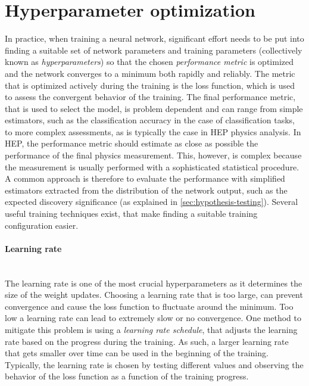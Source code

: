 \section{Hyperparameter optimization} 
In practice, when training a neural network, significant effort needs to be put into finding a suitable set of network parameters and training parameters (collectively known as \emph{hyperparameters}) so that the chosen \emph{performance metric} is optimized and the network converges to a minimum both rapidly and reliably. 
The metric that is optimized actively during the training is the loss function, which is used to assess the convergent behavior of the training. 
The final performance metric, that is used to select the model, is problem dependent and can range from simple estimators, such as the classification accuracy in the case of classification tasks, to more complex assessments, as is typically the case in HEP physics analysis.
In HEP, the performance metric should estimate as close as possible the performance of the final physics measurement. This, however, is complex because the measurement is usually performed with a sophisticated statistical procedure. 
A common approach is therefore to evaluate the performance with simplified estimators extracted from the distribution of the network output, such as the expected discovery significance (as explained in \cref{sec:hypothesis-testing}).
Several useful training techniques exist, that make finding a suitable training configuration easier.

\paragraph{Learning rate} \mbox{}\\
The learning rate is one of the most crucial hyperparameters as it determines the size of the weight updates. Choosing a learning rate that is too large, can prevent convergence and cause the loss function to fluctuate around the minimum. Too low a learning rate can lead to extremely slow or no convergence. 
One method to mitigate this problem is using a \emph{learning rate schedule}, that adjusts the learning rate based on the progress during the training. As such, a larger learning rate that gets smaller over time can be used in the beginning of the training. 
Typically, the learning rate is chosen by testing different values and observing the behavior of the loss function as a function of the training progress.

